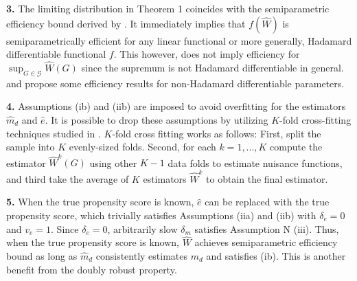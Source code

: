 \documentclass[12pt,oneside,reqno,english]{amsart}
\theoremstyle{definition}
\begin{document}
\textbf{3.} The limiting distribution in Theorem 1 coincides with the semiparametric efficiency bound derived by \cite{Hahn:98}. It immediately implies
that $f(\hat{W})$ is semiparametrically efficient for any linear functional or more generally, Hadamard differentiable functional $f$. 
This however, does not imply efficiency for $\sup_{G\in \mathcal{G}}\hat{W}(G)$ since the supremum is not Hadamard differentiable in general. 
\cite{Song:14} and \cite{Fang:14} propose some efficiency results for non-Hadamard differentiable parameters.

\textbf{4.} Assumptions (ib) and (iib) are imposed to avoid overfitting for the estimators $\hat{m}_{d}$ and $\hat{e}$. 
It is possible to drop these assumptions by utilizing $K$-fold cross-fitting techniques studied in
\cite{CCDDHN:17}. $K$-fold cross fitting works as follows:  
First, split the sample into $K$ evenly-sized folds. Second, for each $k=1,...,K$ compute the estimator $\hat{W}^{k}(G)$ using other $K-1$ data folds to estimate nuisance functions, and third take the average of $K$ estimators $\hat{W}^{k}$ to obtain the final estimator. 

\textbf{5.} When the true propensity score is known, $\hat{e}$ can be replaced with the true propensity score, which trivially satisfies Assumptions (iia) and (iib)
with $\delta_{e}=0$ and $v_{e}=1$. Since $\delta_{e}=0$, arbitrarily slow $\delta_{m}$ satisfies Assumption N (iii). 
Thus, when the true propensity score is known, $\hat{W}$ achieves semiparametric efficiency bound as long as $\hat{m}_{d}$ consistently estimates $m_{d}$ and satisfies 
(ib). This is another benefit from the doubly robust property. 
\end{document}
